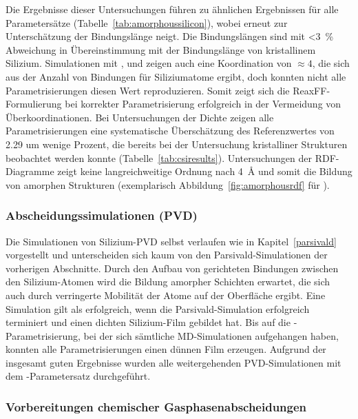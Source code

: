 Die Ergebnisse dieser Untersuchungen führen zu ähnlichen Ergebnissen für alle Parametersätze (Tabelle~\ref{tab:amorphoussilicon}), wobei  erneut zur Unterschätzung der Bindungslänge neigt.
Die Bindungslängen sind mit \SI{<3}{\percent} Abweichung in Übereinstimmung mit der Bindungslänge von kristallinem Silizium.
Simulationen mit ,  und  zeigen auch eine Koordination von $\approx\num{4}$, die sich aus der Anzahl von Bindungen für Siliziumatome ergibt, doch konnten nicht alle Parametrisierungen diesen Wert reproduzieren.
Somit zeigt sich die ReaxFF-Formulierung bei korrekter Parametrisierung erfolgreich in der Vermeidung von Überkoordinationen.
Bei Untersuchungen der Dichte zeigen alle Parametrisierungen eine systematische Überschätzung des Referenzwertes von \SI{2.29}{\gpcc}\cite{remes_optical_1998} um wenige Prozent, die bereits bei der Untersuchung kristalliner Strukturen beobachtet werden konnte (Tabelle~\ref{tab:csiresults}).
Untersuchungen der RDF-Diagramme zeigt keine langreichweitige Ordnung nach \SI{4}{\angstrom} und somit die Bildung von amorphen Strukturen (exemplarisch Abbildung~\ref{fig:amorphousrdf} für ).

\subsubsection{Abscheidungssimulationen (PVD)}

Die Simulationen von Silizium-PVD selbst verlaufen wie in Kapitel~\ref{parsivald} vorgestellt und unterscheiden sich kaum von den Parsivald-Simulationen der vorherigen Abschnitte.
Durch den Aufbau von gerichteten Bindungen zwischen den Silizium-Atomen wird die Bildung amorpher Schichten erwartet, die sich auch durch verringerte Mobilität der Atome auf der Oberfläche ergibt.
Eine Simulation gilt als erfolgreich, wenn die Parsivald-Simulation erfolgreich terminiert und einen dichten Silizium-Film gebildet hat.
Bis auf die -Parametrisierung, bei der sich sämtliche MD-Simulationen aufgehangen haben, konnten alle Parametrisierungen einen dünnen Film erzeugen.
Aufgrund der insgesamt guten Ergebnisse wurden alle weitergehenden PVD-Simulationen mit dem -Parametersatz durchgeführt.

\subsubsection{Vorbereitungen chemischer Gasphasenabscheidungen}

